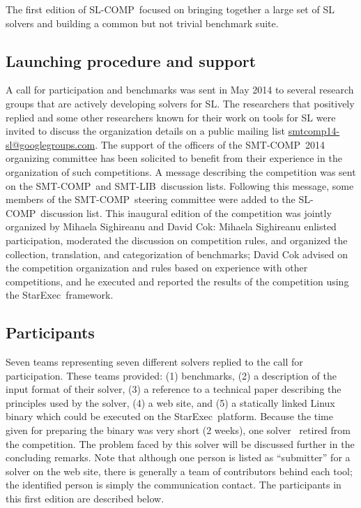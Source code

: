\documentclass[twoside,11pt]{article}
\newcommand{\smtlib}{\textsf{SMT-LIB}}
\newcommand{\smtcomp}{\textsf{SMT-COMP}}
\newcommand{\slcomp}{\textsf{SL-COMP}}
\newcommand{\starexec}{\textsf{StarExec}}
\begin{document}
The first edition of \slcomp\ focused on %
bringing together a large set of SL solvers and
building a common but not trivial benchmark suite. 

\subsection{Launching procedure and support}
A call for participation and benchmarks was sent
in May 2014 %
to several research groups 
that are actively developing solvers for SL.
The researchers that positively replied and some other researchers known for their work on tools for SL were invited to discuss the organization details on a public mailing list \url{smtcomp14-sl@googlegroups.com}.
The support of the officers of the \smtcomp\ 2014 organizing committee has been solicited to benefit from their experience in the organization of such competitions.
%
A message describing the competition was sent on the \smtcomp\ and \smtlib\ discussion lists. Following this message, some members of the \smtcomp\ steering committee were added to the \slcomp\ discussion list. 
This inaugural edition of the competition was jointly organized by Mihaela Sighireanu and David Cok:
Mihaela Sighireanu enlisted participation, moderated the discussion on competition rules, and organized the 
collection, translation, and categorization of benchmarks; 
David Cok advised on the competition organization and rules based on experience with other competitions, and he executed and reported the results of the competition using the \starexec\ framework.


\subsection{Participants}
Seven teams representing seven different solvers replied to the call for participation.
These teams provided:
(1) benchmarks, 
(2) a description of the input format of their solver, 
(3) a reference to a technical paper describing the principles used by the solver, 
(4) a web site, and
(5) a statically linked Linux binary which could be executed on the \starexec\ platform.
%
Because the time given for preparing the binary was very short (2 weeks), one solver~\cite{HasseIOP13}
retired from the competition. The problem faced by this solver will be discussed further in the concluding remarks.
%
Note that although one person is listed as ``submitter'' for a solver on the web site,
there is generally a team of contributors behind each tool; the identified person is simply the communication contact.
%
The participants in this first edition are described below.
\end{document}
